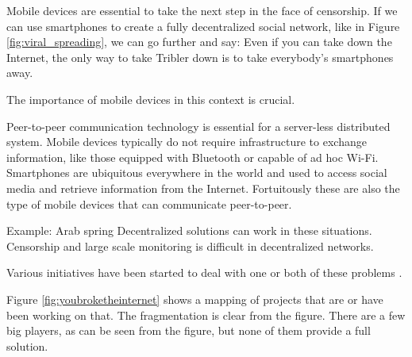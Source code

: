 Mobile devices are essential to take the next step in the face of censorship.
If we can use smartphones to create a fully decentralized social network, like in Figure \ref{fig:viral_spreading}, we can go further and say:
Even if you can take down the Internet, the only way to take Tribler down is to take everybody's smartphones away.

The importance of mobile devices in this context is crucial.

Peer-to-peer communication technology is essential for a server-less distributed system.
Mobile devices typically do not require infrastructure to exchange information, like those equipped with Bluetooth or capable of ad hoc Wi-Fi.
Smartphones are ubiquitous everywhere in the world and used to access social media and retrieve information from the Internet.
Fortuitously these are also the type of mobile devices that can communicate peer-to-peer.

Example: Arab spring \cite{pouwelse2012censorshipfree}
Decentralized solutions can work in these situations.
Censorship and large scale monitoring is difficult in decentralized networks.



Various initiatives have been started to deal with one or both of these problems \cite{redecentralize2015alternativeinternet}.

Figure \ref{fig:youbroketheinternet} shows a mapping of projects that are or have been working on that.
The fragmentation is clear from the figure.
There are a few big players, as can be seen from the figure, but none of them provide a full solution.






